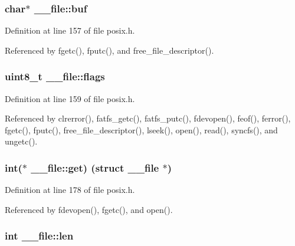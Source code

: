 \subsubsection[{\texorpdfstring{buf}{buf}}]{\setlength{\rightskip}{0pt plus 5cm}char$\ast$ \+\_\+\+\_\+file\+::buf}\hypertarget{struct____file_a3e5a85ae919a90efbb7cb44ccb54fe46}{}\label{struct____file_a3e5a85ae919a90efbb7cb44ccb54fe46}


Definition at line 157 of file posix.\+h.



Referenced by fgetc(), fputc(), and free\+\_\+file\+\_\+descriptor().

\subsubsection[{\texorpdfstring{flags}{flags}}]{\setlength{\rightskip}{0pt plus 5cm}uint8\+\_\+t \+\_\+\+\_\+file\+::flags}\hypertarget{struct____file_a8d11df8679502efee09740f97d7c277b}{}\label{struct____file_a8d11df8679502efee09740f97d7c277b}


Definition at line 159 of file posix.\+h.



Referenced by clrerror(), fatfs\+\_\+getc(), fatfs\+\_\+putc(), fdevopen(), feof(), ferror(), fgetc(), fputc(), free\+\_\+file\+\_\+descriptor(), lseek(), open(), read(), syncfs(), and ungetc().

\subsubsection[{\texorpdfstring{get}{get}}]{\setlength{\rightskip}{0pt plus 5cm}int($\ast$ \+\_\+\+\_\+file\+::get) (struct {\bf \+\_\+\+\_\+file} $\ast$)}\hypertarget{struct____file_a2d816b077c3af0425344fe4b283dad33}{}\label{struct____file_a2d816b077c3af0425344fe4b283dad33}


Definition at line 178 of file posix.\+h.



Referenced by fdevopen(), fgetc(), and open().

\subsubsection[{\texorpdfstring{len}{len}}]{\setlength{\rightskip}{0pt plus 5cm}int \+\_\+\+\_\+file\+::len}\hypertarget{struct____file_a30309efd13a75ed510bb2370debafaf8}{}\label{struct____file_a30309efd13a75ed510bb2370debafaf8}


